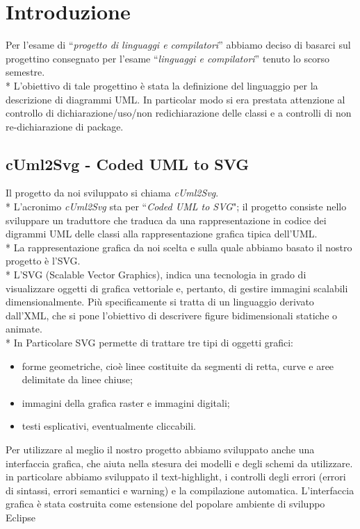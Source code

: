 \chapter{Introduzione}

Per l'esame di ``\emph{progetto di linguaggi e compilatori}'' abbiamo deciso di
basarci sul progettino consegnato per l'esame ``\emph{linguaggi e compilatori}''
tenuto lo scorso semestre. \\*
L'obiettivo di tale progettino è stata la definizione del linguaggio per la 
descrizione di diagrammi UML. In particolar modo si era prestata attenzione al
controllo di dichiarazione/uso/non redichiarazione
delle classi e a controlli di non re-dichiarazione di package.




\section{cUml2Svg - Coded UML to SVG} 
Il progetto da noi sviluppato si chiama \emph{cUml2Svg}. \\*
L'acronimo \emph{cUml2Svg} sta per ``\emph{Coded UML to SVG}"; 
il progetto consiste nello sviluppare un traduttore che traduca da una
rappresentazione in codice dei digrammi UML delle classi alla rappresentazione
grafica tipica dell'UML.\\*
La rappresentazione grafica da noi scelta e sulla quale abbiamo basato il nostro
progetto è l'SVG.\\*
L'SVG (Scalable Vector Graphics), indica una tecnologia in grado di visualizzare oggetti 
di grafica vettoriale e, pertanto, di gestire immagini scalabili dimensionalmente.
Più specificamente si tratta di un linguaggio derivato dall'XML, che si pone l'obiettivo 
di descrivere figure bidimensionali statiche o animate. \\*
In Particolare SVG permette di trattare tre tipi di oggetti grafici:

\begin{itemize}
  \item forme geometriche, cioè linee costituite da segmenti di retta, curve e
  aree delimitate da linee chiuse;
  \item immagini della grafica raster e immagini digitali;
  \item testi esplicativi, eventualmente cliccabili.
\end{itemize} 


Per utilizzare al meglio il nostro progetto abbiamo sviluppato anche una 
interfaccia grafica, che aiuta nella stesura dei modelli e degli schemi da
utilizzare. in particolare abbiamo sviluppato il text-highlight, i
controlli degli errori (errori di sintassi, errori semantici e warning) e la
compilazione automatica.
L'interfaccia grafica è stata costruita
come estensione del popolare ambiente di sviluppo Eclipse~\cite{eclipse_website:1}

